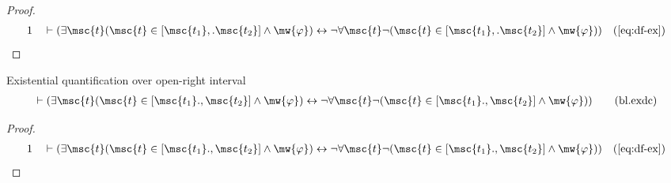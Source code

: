 \begin{proof}
\begin{align}
  1 &&  & \vdash ( \exists \msc{t} ( \msc{t} \in [ \msc{t_1} ,. \msc{t_2} ]
     \wedge \mw{\varphi} ) \leftrightarrow \lnot \forall
     \msc{t} \lnot ( \msc{t} \in [ \msc{t_1} ,. \msc{t_2}
     ] \wedge \mw{\varphi} )
     )&(\mbox{\ref{eq:df-ex}})\notag
\end{align}
\end{proof}

\begin{lemma} {Existential quantification over open-right
interval}
\begin{align}
\vdash ( \exists \msc{t} ( \msc{t} \in [ \msc{t_1} ., \msc{t_2} ] \wedge
    \mw{\varphi} ) \leftrightarrow \lnot \forall \msc{t} \lnot ( \msc{t} \in [
    \msc{t_1} ., \msc{t_2} ] \wedge \mw{\varphi} )
    )\label{eq:bl.exdc}\tag{bl.exdc}
\end{align}
\end{lemma}


\begin{proof}
\begin{align}
  1 &&  & \vdash ( \exists \msc{t} ( \msc{t} \in [ \msc{t_1} ., \msc{t_2} ]
     \wedge \mw{\varphi} ) \leftrightarrow \lnot \forall
     \msc{t} \lnot ( \msc{t} \in [ \msc{t_1} ., \msc{t_2}
     ] \wedge \mw{\varphi} )
     )&(\mbox{\ref{eq:df-ex}})\notag
\end{align}
\end{proof}

